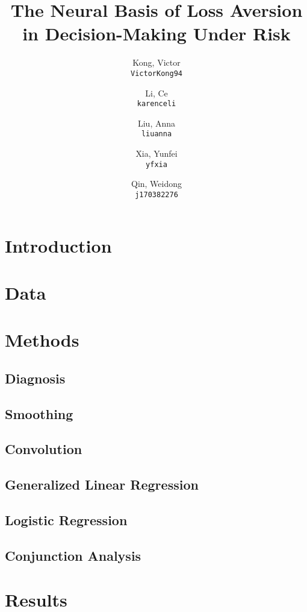 \documentclass[11pt]{article}
\title{The Neural Basis of Loss Aversion in Decision-Making Under Risk}
\author{
  Kong, Victor\\
  \texttt{VictorKong94}
  \and
  Li, Ce\\
  \texttt{karenceli}
  \and
  Liu, Anna\\
  \texttt{liuanna}
  \and
  Xia, Yunfei\\
  \texttt{yfxia}
  \and
  Qin, Weidong\\
  \texttt{j170382276}
}
\begin{document}
\maketitle

\abstract{}

\section{Introduction}
        

\section{Data}
        

\section{Methods}

    \subsection{Diagnosis}
            
    \subsection{Smoothing}
            
    \subsection{Convolution}
            
    \subsection{Generalized Linear Regression}
            
    \subsection{Logistic Regression}
            
    \subsection{Conjunction Analysis}
            

\section{Results}
\end{document}

